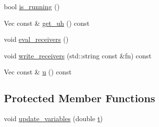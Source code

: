 \begin{DoxyCompactItemize}
\item 
bool \hyperlink{classTspeed_1_1TimeAdvance_a31398b7880b86622ba3c1378e2ac91d1}{is\-\_\-running} ()
\item 
Vec const \& \hyperlink{classTspeed_1_1TimeAdvance_a3b4a0ed12f2fea72ce004dcdf467f10a}{get\-\_\-uh} () const 
\item 
void \hyperlink{classTspeed_1_1TimeAdvance_aa4b4c155a949f5629e49da06a13e2672}{eval\-\_\-receivers} ()
\item 
void \hyperlink{classTspeed_1_1TimeAdvance_a4030ab6e3606e5b762d236a4bc65fe68}{write\-\_\-receivers} (std\-::string const \&fn) const 
\item 
Vec const \& \hyperlink{classTspeed_1_1TimeAdvance_a3c27a46c3be458c4c6b9b7802c58a30b}{u} () const 
\end{DoxyCompactItemize}
\subsection*{Protected Member Functions}
\begin{DoxyCompactItemize}
\item 
void \hyperlink{classTspeed_1_1TimeAdvance_ac083260ffe62e2a3eff1c1ab6068a1ad}{update\-\_\-variables} (double \hyperlink{plot__seismogram_8m_aaccc9105df5383111407fd5b41255e23}{t})
\end{DoxyCompactItemize}
